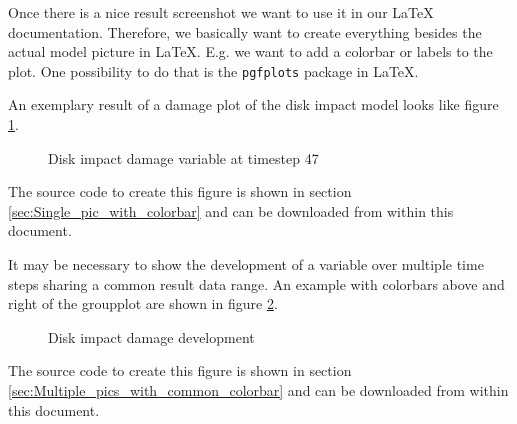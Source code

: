

Once there is a nice result screenshot we want to use it in our \LaTeX{} documentation. Therefore, we basically want to create everything besides the actual model picture in \LaTeX. E.g. we want to add a colorbar or labels to the plot. One possibility to do that is the \verb+pgfplots+ package in \LaTeX.

An exemplary result of a damage plot of the \marktool{\toolname} disk impact model looks like figure \ref{fig:Peridigm_Disk_Impact_47_Damage_ct}.

\begin{figure}[htbp]
\centering
\tikzexternalenable
{}

\tikzexternaldisable
\caption{Disk impact damage variable at timestep 47}
\label{fig:Peridigm_Disk_Impact_47_Damage_ct}
\end{figure}

The source code to create this figure is shown in section \ref{sec:Single_pic_with_colorbar} and can be downloaded from within this document.


It may be necessary to show the development of a variable over multiple time steps sharing a common result data range. An example with colorbars above and right of the groupplot are shown in figure \ref{fig:Peridigm_Disk_Impact_Development_Damage}.

\begin{figure}[htbp]
\centering
\tikzexternalenable
{}

\tikzexternaldisable
\caption{Disk impact damage development}
\label{fig:Peridigm_Disk_Impact_Development_Damage}
\end{figure}
% 
The source code to create this figure is shown in section \ref{sec:Multiple_pics_with_common_colorbar} and can be downloaded from within this document.